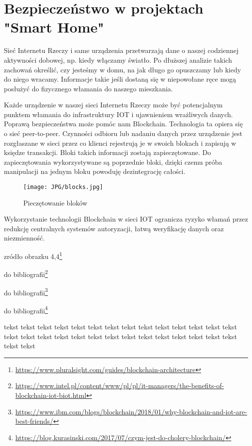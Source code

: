 \documentclass{xmgr}
\begin{document}
\section{Bezpieczeństwo w projektach "Smart Home"}

Sieć Internetu Rzeczy i same urządzenia przetwarzają dane o naszej codziennej aktywności dobowej, np. kiedy włączamy światło. Po dłuższej analizie takich zachowań określić, czy jesteśmy w domu, na jak długo go opuszczamy lub kiedy do niego wracamy. Informacje takie jeśli dostaną się w niepowołane ręce mogą posłużyć do fizycznego włamania do naszego mieszkania.

Każde urządzenie w naszej sieci Internetu Rzeczy może być potencjalnym punktem włamania do infrastruktury IOT i ujawnieniem wrażliwych danych. Poprawą bezpieczeństwa może pomóc nam Blockchain. Technologia ta opiera się o sieć peer-to-peer. Czynności odbioru lub nadaniu danych przez urządzenie jest rozgłaszane w sieci przez co klienci rejestrują je w swoich blokach i zapisują w księdze transakcji. Bloki takich informacji zostają zapieczętowane. Do zapieczętowania wykorzystywane są poprzednie bloki, dzięki czemu próba manipulacji na jednym bloku powoduję dezintegrację całości.
\begin{figure}[h]
\texttt{[image: JPG/blocks.jpg]}
\caption{Pieczętowanie bloków}
\end{figure}

Wykorzystanie technologii Blockchain w sieci IOT ogranicza ryzyko włamań przez redukcję centralnych systemów autoryzacji, łatwą weryfikację danych oraz niezmienność.

zródło obrazku 4,4\footnote{\url{https://www.pluralsight.com/guides/blockchain-architecture}}

do bibliografii\footnote{\url{https://www.intel.pl/content/www/pl/pl/it-managers/the-benefits-of-blockchain-iot-biot.html}}

do bibliografii\footnote{\url{https://www.ibm.com/blogs/blockchain/2018/01/why-blockchain-and-iot-are-best-friends/}}

do bibliografii\footnote{\url{https://blog.kurasinski.com/2017/07/czym-jest-do-cholery-blockchain/}}



\summary
tekst tekst tekst tekst tekst tekst tekst tekst tekst tekst tekst tekst tekst tekst tekst
tekst tekst tekst tekst tekst tekst tekst tekst tekst tekst tekst tekst tekst tekst tekst
\end{document}
